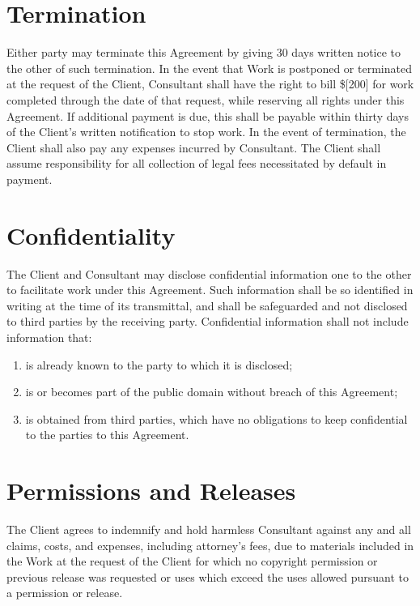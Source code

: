 \documentclass[10pt]{article}
\begin{document}
\section{Termination}

Either party may terminate this Agreement by giving 30 days written notice
to the other of such termination. In the event that Work is postponed or
terminated at the request of the Client, Consultant shall have the right to
bill  \$[200]
for work completed through the date of that request, while
reserving all rights under this Agreement. If additional payment is due,
this shall be payable within thirty days of the Client's written
notification to stop work. In the event of termination, the Client shall
also pay any expenses incurred by Consultant.  The Client shall assume
responsibility for all collection of legal fees necessitated by default in
payment.




\section{Confidentiality}

The Client and Consultant may disclose confidential information one to the
other to facilitate work under this Agreement.  Such information shall be so
identified in writing at the time of its transmittal, and shall be
safeguarded and not disclosed to third parties by the receiving party.
Confidential information shall not include information that:

\begin{enumerate}
  \item is already known to the party to which it is disclosed; 
  \item is or becomes part of the public domain without breach of this Agreement;
  \item is obtained from third parties, which have no obligations to keep
    confidential to the parties to this Agreement. 
\end{enumerate}




\section{Permissions and Releases}

The Client agrees to indemnify and hold harmless Consultant against any and
all claims, costs, and expenses, including attorney's fees, due to materials
included in the Work at the request of the Client for which no copyright
permission or previous release was requested or uses which exceed the uses
allowed pursuant to a permission or release.  
\end{document}
